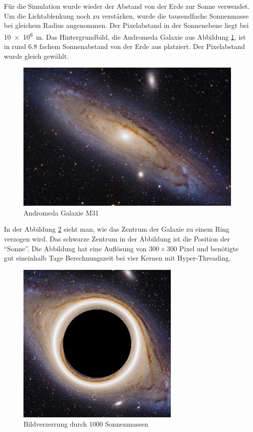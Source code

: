 \begin{refsection}
Für die Simulation wurde wieder der Abstand von der Erde zur Sonne
verwendet.  Um die Lichtablenkung noch zu verstärken, wurde die
tausendfache Sonnenmasse bei gleichem Radius angenommen.  Der
Pixelabstand in der Sonnenebene liegt bei \SI{10e6}{\meter}.  Das
Hintergrundbild, die Andromeda Galaxie aus Abbildung \ref{fig:m31},
ist in rund 6.8 fachem Sonnenabstand von der Erde aus platziert.  Der
Pixelabstand wurde gleich gewählt.

\begin{figure}
  \centering
  \includegraphics[width=\textwidth]{cluster/images/m31_comolli_2193}
  \caption{Andromeda Galaxie M31 \cite{nasa:andromedaM31}}
  \label{fig:m31}
\end{figure}

In der Abbildung \ref{fig:einsteinringSim} sieht man, wie das Zentrum
der Galaxie zu einem Ring verzogen wird.  Das schwarze Zentrum in der
Abbildung ist die Position der ``Sonne''.  Die Abbildung hat eine
Auflösung von \(300\times300\) Pixel und benötigte gut eineinhalb Tage
Berechnungszeit bei vier Kernen mit Hyper-Threading.

\begin{figure}
  \centering
  \includegraphics[width=.6\textwidth]{cluster/images/einsteinring}
  \caption{Bildverzerrung durch 1000 Sonnenmassen}
  \label{fig:einsteinringSim}
\end{figure}

\printbibliography[heading=subbibliography]
\end{refsection}

